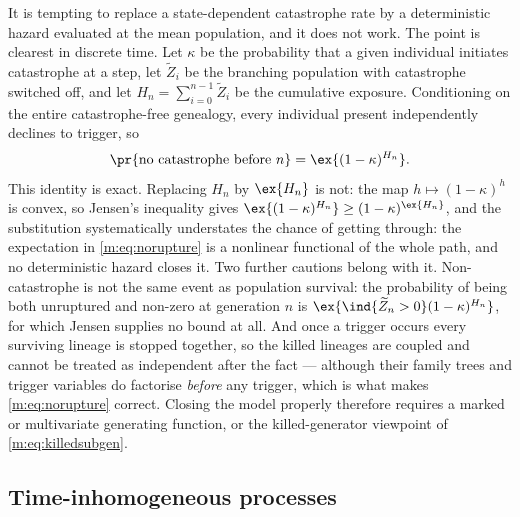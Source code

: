 \begin{remark}
\label{m:rem:notmeanfield}
It is tempting to replace a state-dependent catastrophe rate by a deterministic
hazard evaluated at the mean population, and it does not work. The point is
clearest in discrete time. Let $\kappa$ be the probability that a given individual
initiates catastrophe at a step, let $\widetilde Z_i$ be the branching population
with catastrophe switched off, and let $H_n=\sum_{i=0}^{n-1}\widetilde Z_i$ be the
cumulative exposure. Conditioning on the entire catastrophe-free genealogy, every
individual present independently declines to trigger, so
\begin{equation}
\label{m:eq:norupture}
\pr{\text{no catastrophe before }n} = \ex{(1-\kappa)^{H_n}} .
\end{equation}
This identity is exact. Replacing $H_n$ by $\ex{H_n}$ is not: the map
$h\mapsto(1-\kappa)^h$ is convex, so Jensen's inequality gives
$\ex{(1-\kappa)^{H_n}}\ge(1-\kappa)^{\ex{H_n}}$, and the substitution
systematically understates the chance of getting through: the expectation in
\cref{m:eq:norupture} is a nonlinear functional of the whole path, and no
deterministic hazard closes it.
Two further cautions belong with it. Non-catastrophe is not the same event as
population survival: the probability of being both unruptured and non-zero at
generation $n$ is $\ex{\ind\{\widetilde Z_n>0\}(1-\kappa)^{H_n}}$, for which
Jensen supplies no bound at all. And once a trigger occurs every surviving lineage
is stopped together, so the killed lineages are coupled and cannot be treated as
independent after the fact --- although their family trees and trigger variables do
factorise \emph{before} any trigger, which is what makes \cref{m:eq:norupture}
correct. Closing the model properly therefore requires a marked or multivariate
generating function, or the killed-generator viewpoint of \cref{m:eq:killedsubgen}.
\end{remark}

\subsection{Time-inhomogeneous processes}
\label{m:sec:inhomogeneous}

